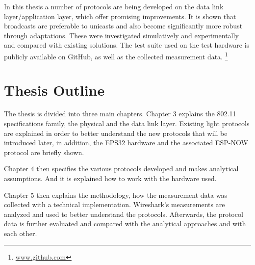 In this thesis a number of protocols are being developed on the data link layer/application layer,
which offer promising improvements.
It is shown that broadcasts are preferable to unicasts
and also become significantly more robust through adaptations.
These were investigated simulatively and experimentally and compared with existing solutions.
The test suite used on the test hardware is publicly available on GitHub,
as well as the collected measurement data.
\footnote{\url{www.github.com}}

\section*{Thesis Outline}

The thesis is divided into three main chapters.
Chapter 3 explains the 802.11 specifications family, the physical and the data link layer.
Existing light protocols are explained in order to better understand the new protocols that will be introduced later,
in addition, the EPS32 hardware and the associated ESP-NOW protocol are briefly shown.

Chapter 4 then specifies the various protocols developed and makes analytical assumptions.
And it is explained how to work with the hardware used.

Chapter 5 then explains the methodology, how the measurement data was collected with a technical implementation.
Wireshark's measurements are analyzed and used to better understand the protocols.
Afterwards, the protocol data is further evaluated and compared with the analytical approaches and with each other.